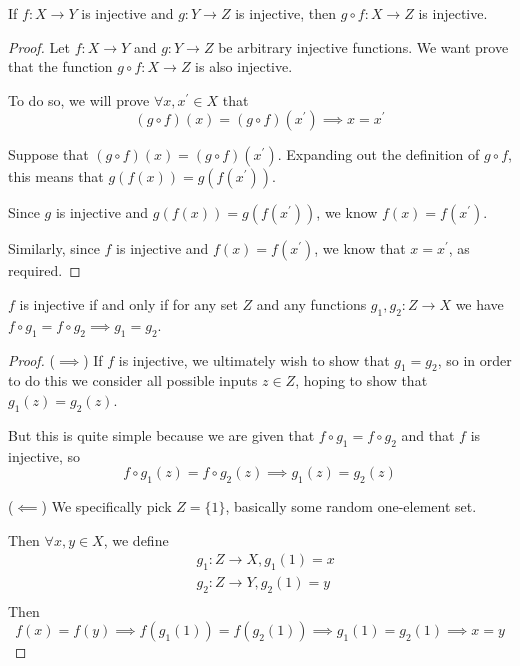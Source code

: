 \begin{proposition}
If $f:X \to Y$ is injective and $g:Y \to Z$ is injective, then $g \circ f:X \to Z$ is injective.
\end{proposition}
\begin{proof}
Let $f:X \to Y$ and $g:Y \to Z$ be arbitrary injective functions. We want prove that the function $g \circ f:X \to Z$ is also injective.

To do so, we will prove $\forall x,x^\prime \in X$ that 
\[ (g \circ f)(x) = (g \circ f)(x^\prime) \implies x=x^\prime \]

Suppose that $(g \circ f)(x) = (g \circ f)(x^\prime)$. Expanding out the definition of $g \circ f$, this means that $g(f(x)) = g(f(x^\prime))$.

Since $g$ is injective and $g(f(x)) = g(f(x^\prime))$, we know $f(x)=f(x^\prime)$.

Similarly, since $f$ is injective and $f(x) = f(x^\prime)$, we know that $x=x^\prime$, as required.
\end{proof}

\begin{proposition}
$f$ is injective if and only if for any set $Z$ and any functions $g_1,g_2:Z\to X$ we have $f\circ g_1=f\circ g_2 \implies g_1=g_2$.
\end{proposition}

\begin{proof}
($\implies$) If $f$ is injective, we ultimately wish to show that $g_1=g_2$, so in order to do this we consider all possible inputs $z \in Z$, hoping to show that $g_1(z)=g_2(z)$.

But this is quite simple because we are given that $f\circ g_1=f\circ g_2$ and that $f$ is injective, so
\[ f \circ g_1(z)=f \circ g_2(z) \implies g_1(z)=g_2(z) \]

($\impliedby$) We specifically pick $Z=\{1\}$, basically some random one-element set.

Then $\forall x,y \in X$, we define
\begin{align*}
& g_1:Z \to X, g_1(1)=x \\
& g_2:Z \to Y, g_2(1)=y \\
\end{align*}
Then
\[ f(x)=f(y) \implies f(g_1(1))=f(g_2(1)) \implies g_1(1)=g_2(1) \implies x=y \]
\end{proof}

